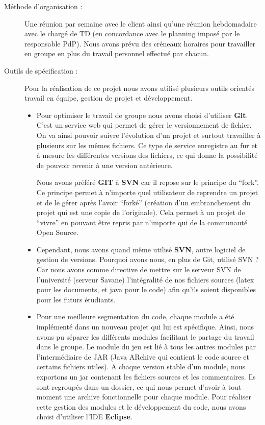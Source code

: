 \begin{description}
\item[Méthode d’organisation :]

Une réunion par semaine avec le client ainsi qu'une réunion hebdomadaire avec le chargé de TD (en concordance avec le planning imposé par le responsable PdP).
Nous avons prévu des créneaux horaires pour travailler en groupe en plus du travail personnel effectué par chacun.\\

\item[Outils de spécification :]

Pour la réalisation de ce projet nous avons utilisé plusieurs outils orientés travail en équipe, gestion de projet et développement.\\

 \begin{itemize}
      \item Pour optimiser le travail de groupe nous avons choisi d’utiliser \textbf{Git}. C’est un service web qui permet de gérer le versionnement de fichier. On va ainsi pouvoir suivre l’évolution d’un projet et surtout travailler à plusieurs sur les mêmes fichiers. Ce type de service enregistre au fur et à mesure les différentes versions des fichiers, ce qui donne la possibilité de pouvoir revenir à une version antérieure.

Nous avons préféré \textbf{GIT} à \textbf{SVN} car il repose sur le principe du “fork”. Ce principe permet à n’importe quel utilisateur de reprendre un projet et de le gérer après l’avoir “forké” (création d’un embranchement du projet qui est une copie de l’originale). Cela permet à un projet de “vivre” en pouvant être repris par n’importe qui de la communauté Open Source.\\

\item Cependant, nous avons quand même utilisé \textbf{SVN}, autre logiciel de gestion de versions. Pourquoi avons nous, en plus de Git, utilisé SVN ? Car nous avons comme directive de mettre sur le serveur SVN de l’université (serveur Savane) l’intégralité de nos fichiers sources (latex pour les documents, et java pour le code) afin qu’ils soient disponibles pour les futurs étudiants.\\

\item Pour une meilleure segmentation du code, chaque module a été implémenté dans un nouveau projet qui lui est spécifique. Ainsi, nous avons pu séparer les différents modules facilitant le partage du travail dans le groupe. Le module du jeu est lié à tous les autres modules par l’intermédiaire de JAR (Java ARchive qui contient le code source et certains fichiers utiles). A chaque version stable d’un module, nous exportons un jar contenant les fichiers sources et les commentaires. Ils sont regroupés dans un dossier, ce qui nous permet d’avoir à tout moment une archive fonctionnelle pour chaque module. Pour réaliser cette gestion des modules  et le développement du code, nous avons choisi d’utiliser l’IDE \textbf{Eclipse}.


\end{itemize}
\end{description}
